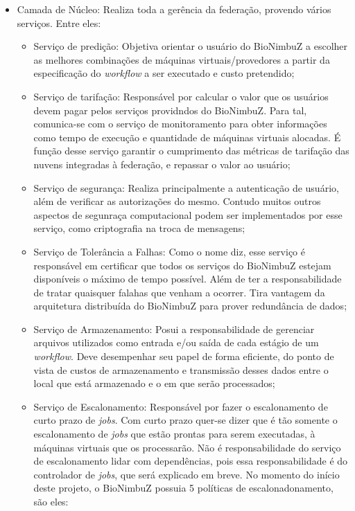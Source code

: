 \begin{itemize}
	\item Camada de Núcleo: Realiza toda a gerência da federação, provendo vários serviços. Entre eles:
	\begin{itemize}
		\item Serviço de predição: Objetiva orientar o usuário do BioNimbuZ a escolher as melhores combinações de máquinas virtuais/provedores a partir da especificação do \textit{workflow} a ser executado e custo pretendido;
		\item Serviço de tarifação: Responsável por calcular o valor que os usuários devem pagar pelos serviços providndos do BioNimbuZ. Para tal, comunica-se com o serviço de monitoramento para obter informações como tempo de execução e quantidade de máquinas virtuais alocadas. É função desse serviço garantir o cumprimento das métricas de tarifação das nuvens integradas à federação, e repassar o valor ao usuário;
		\item Serviço de segurança: Realiza principalmente a autenticação de usuário, além de verificar as autorizações do mesmo. Contudo muitos outros aspectos de segunraça computacional podem ser implementados por esse serviço, como criptografia na troca de mensagens;
		\item Serviço de Tolerância a Falhas: Como o nome diz, esse serviço é responsável em certificar que todos os serviços do BioNimbuZ estejam disponíveis o máximo de tempo possível. Além de ter a responsabilidade de tratar quaisquer falahas que venham a ocorrer. Tira vantagem da arquitetura distribuída do BioNimbuZ para prover redundância de dados;
		\item Serviço de Armazenamento: Posui a responsabilidade de gerenciar arquivos utilizados como entrada e/ou saída de cada estágio de um \textit{workflow}. Deve desempenhar seu papel de forma eficiente, do ponto de vista de custos de armazenamento e transmissão desses dados entre o local que está armazenado e o em que serão processados;
		\item Serviço de Escalonamento: Responsável por fazer o escalonamento de curto prazo de \textit{jobs}. Com curto prazo quer-se dizer que é tão somente o escalonamento de \textit{jobs} que estão prontas para serem executadas, à máquinas virtuais que os processarão. Não é responsabilidade do serviço de escalonamento lidar com dependências, pois essa responsabilidade é do controlador de \textit{jobs}, que será explicado em breve.
		No momento do início deste projeto, o BioNimbuZ possuia 5 políticas de escalonadonamento, são eles:
		\begin{itemize}

\end{itemize}
\end{itemize}
\end{itemize}

